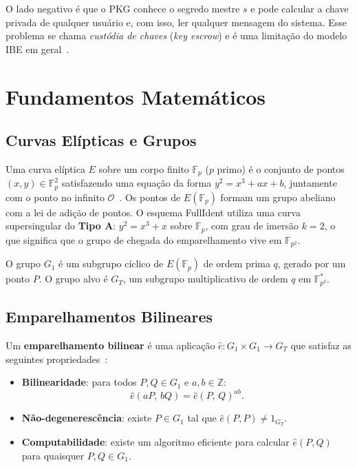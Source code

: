 O lado negativo é que o PKG conhece o segredo mestre $s$ e pode calcular a chave privada de
qualquer usuário e, com isso, ler qualquer mensagem do sistema. Esse problema se chama
\textit{custódia de chaves} (\textit{key escrow}) e é uma limitação do modelo IBE em
geral~\cite{franklin2008nist}.


\section{Fundamentos Matemáticos}
\label{sec:funcionamento}

\subsection{Curvas Elípticas e Grupos}

Uma curva elíptica $E$ sobre um corpo finito $\mathbb{F}_p$ ($p$ primo) é o conjunto de pontos
$(x, y) \in \mathbb{F}_p^2$ satisfazendo uma equação da forma $y^2 = x^3 + ax + b$, juntamente
com o ponto no infinito $\mathcal{O}$~\cite{menezes2009intro}. Os pontos de $E(\mathbb{F}_p)$
formam um grupo abeliano com a lei de adição de pontos. O esquema FullIdent utiliza uma curva
supersingular do \textbf{Tipo A}: $y^2 = x^3 + x$ sobre $\mathbb{F}_p$, com grau de imersão
$k = 2$, o que significa que o grupo de chegada do emparelhamento vive em $\mathbb{F}_{p^2}$.

O grupo $G_1$ é um subgrupo cíclico de $E(\mathbb{F}_p)$ de ordem prima $q$, gerado por um
ponto $P$. O grupo alvo é $G_T$, um subgrupo multiplicativo de ordem $q$ em
$\mathbb{F}_{p^2}^*$.

\subsection{Emparelhamentos Bilineares}

Um \textbf{emparelhamento bilinear} é uma aplicação $\hat{e}: G_1 \times G_1 \rightarrow G_T$
que satisfaz as seguintes propriedades~\cite{menezes2009intro,boneh2001ibe}:

\begin{itemize}
  \item \textbf{Bilinearidade}: para todos $P, Q \in G_1$ e $a, b \in \mathbb{Z}$:
    \[ \hat{e}(aP,\, bQ) = \hat{e}(P,\, Q)^{ab}. \]

  \item \textbf{Não-degenerescência}: existe $P \in G_1$ tal que $\hat{e}(P, P) \neq 1_{G_T}$.

  \item \textbf{Computabilidade}: existe um algoritmo eficiente para calcular $\hat{e}(P, Q)$
    para quaisquer $P, Q \in G_1$.
\end{itemize}


